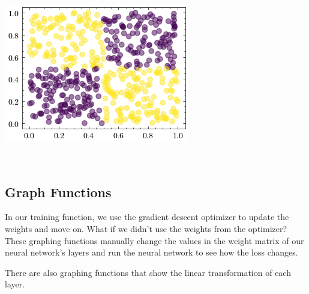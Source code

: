 \documentclass[openany]{book}
\begin{document}
    \begin{center}
    \includegraphics[width=\textwidth]{combined_files/combined_128_1.png}
    \end{center}
    { \hspace*{\fill} \\}
    
    \subsection{Graph Functions}\label{graph-functions}

In our training function, we use the gradient descent optimizer to
update the weights and move on. What if we didn't use the weights from
the optimizer? These graphing functions manually change the values in
the weight matrix of our neural network's layers and run the neural
network to see how the loss changes.

There are also graphing functions that show the linear transformation of
each layer.
\end{document}
